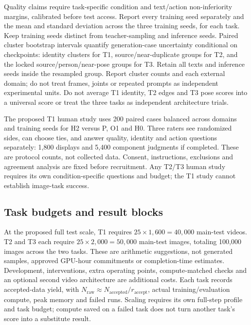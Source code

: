 \documentclass[11pt]{article}
\begin{document}
Quality claims require task-specific condition and text/action non-inferiority margins, calibrated before test access. Report every training seed separately and the mean and standard deviation across the three training seeds, for each task. Keep training seeds distinct from teacher-sampling and inference seeds. Paired cluster bootstrap intervals quantify generation-case uncertainty conditional on checkpoints: identity clusters for T1, source/near-duplicate groups for T2, and the locked source/person/near-pose groups for T3. Retain all texts and inference seeds inside the resampled group. Report cluster counts and each external domain; do not treat frames, joints or repeated prompts as independent experimental units. Do not average T1 identity, T2 edges and T3 pose scores into a universal score or treat the three tasks as independent architecture trials.

The proposed T1 human study uses 200 paired cases balanced across domains and training seeds for H2 versus P, O1 and H0. Three raters see randomized sides, can choose ties, and answer quality, identity and action questions separately: 1,800 displays and 5,400 component judgments if completed. These are protocol counts, not collected data. Consent, instructions, exclusions and agreement analysis are fixed before recruitment. Any T2/T3 human study requires its own condition-specific questions and budget; the T1 study cannot establish image-task success.

\subsection{Task budgets and result blocks}
At the proposed full test scale, T1 requires $25\times1{,}600=40{,}000$ main-test videos. T2 and T3 each require $25\times2{,}000=50{,}000$ main-test images, totaling 100,000 images across the two tasks. These are arithmetic suggestions, not generated samples, approved GPU-hour commitments or completion-time estimates. Development, interventions, extra operating points, compute-matched checks and an optional second video architecture are additional costs. Each task records accepted-data yield, with $N_{\mathrm{raw}}\approx N_{\mathrm{accepted}}/r_{\mathrm{accept}}$, actual training/evaluation compute, peak memory and failed runs. Scaling requires its own full-step profile and task budget; compute saved on a failed task does not turn another task's score into a substitute result.
\end{document}
